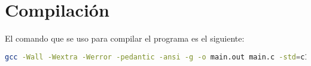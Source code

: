 \section{Compilación}

El comando que se uso para compilar el programa es el siguiente:

\begin{lstlisting}[language=bash]
    gcc -Wall -Wextra -Werror -pedantic -ansi -g -o main.out main.c -std=c11
\end{lstlisting}
